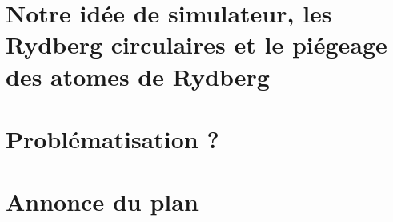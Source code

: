 
\bigskip
\section*{Notre idée de simulateur, les Rydberg circulaires et le piégeage des atomes de Rydberg}

\section*{Problématisation ?}
\section*{Annonce du plan}

